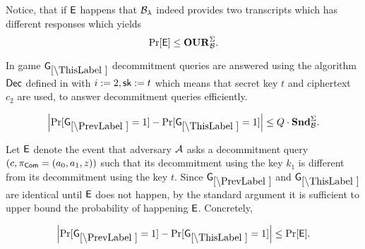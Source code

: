 Notice, that if $\mathsf{E}$ happens that $\mathcal{B}_{\lambda}$ indeed provides two transcripts which has different responses which yields
\[\Pr[\mathsf{E}] \leq \mathbf{OUR}^\Sigma_{\mathcal{B}}.\]

In game $\games_\thisgame$ decommitment queries are answered using the algorithm $\mathsf{Dec}$ defined in  with $i:=2, \mathsf{sk}:=t$ which means that secret key $t$ and ciphertext $c_2$ are used, to answer decommitment queries efficiently. 

\begin{lemma}
\[
\left|\Pr[\games_\prevgame = 1] - \Pr[\games_\thisgame = 1]\right| \leq Q\cdot\snd^\Sigma_\advB.
\]
\end{lemma}

Let $\mathsf{E}$ denote the event that adversary $\mathcal{A}$ asks a decommitment query $(c, \pi_{\mathsf{Com}}=(a_0,a_1,z))$ such that its decommitment using the key $k_1$ is different from its decommitment using the key $t$. Since $\games_\prevgame$ and $\games_\thisgame$ are identical until $\mathsf{E}$ does not happen, by the standard argument it is sufficient to upper bound the probability of happening $\mathsf{E}$. Concretely,  

\[
\left|\Pr[\games_\prevgame = 1] - \Pr[\games_\thisgame = 1]\right| \leq \Pr[\event]. 
\]


